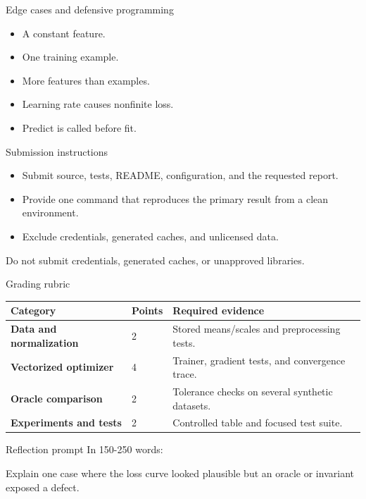 \documentclass[aspectratio=169,11pt]{beamer}
\begin{document}
\begin{frame}{Edge cases and defensive programming}
\small
\begin{itemize}
  \item A constant feature.
  \item One training example.
  \item More features than examples.
  \item Learning rate causes nonfinite loss.
  \item Predict is called before fit.
\end{itemize}
\end{frame}

\begin{frame}{Submission instructions}
\small
\begin{itemize}
  \item Submit source, tests, README, configuration, and the requested report.
  \item Provide one command that reproduces the primary result from a clean environment.
  \item Exclude credentials, generated caches, and unlicensed data.
\end{itemize}
\vspace{0.2cm}
\alert{Do not submit credentials, generated caches, or unapproved libraries.}
\end{frame}

\begin{frame}{Grading rubric}
\scriptsize
\begin{tabularx}{\textwidth}{>{\bfseries}p{} p{} X}
\toprule
Category & Points & Required evidence \\
\midrule
Data and normalization & 2 & Stored means/scales and preprocessing tests. \\
Vectorized optimizer & 4 & Trainer, gradient tests, and convergence trace. \\
Oracle comparison & 2 & Tolerance checks on several synthetic datasets. \\
Experiments and tests & 2 & Controlled table and focused test suite. \\
\bottomrule
\end{tabularx}
\end{frame}

\begin{frame}{Reflection prompt}
In 150-250 words:

Explain one case where the loss curve looked plausible but an oracle or invariant exposed a defect.
\end{frame}
\end{document}
